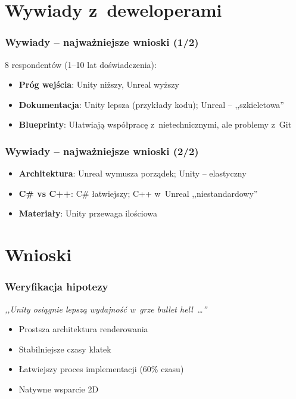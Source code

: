 \documentclass{beamer}
\begin{document}
\section{Wywiady z~deweloperami}

\begin{frame}
  \frametitle{Wywiady -- najważniejsze wnioski (1/2)}
  8 respondentów (1--10 lat doświadczenia):
  \vspace{0.2cm}
  \begin{itemize}
    \item \textbf{Próg wejścia}: Unity niższy, Unreal wyższy
    \item \textbf{Dokumentacja}: Unity lepsza (przykłady kodu); Unreal -- ,,szkieletowa''
    \item \textbf{Blueprinty}: Ułatwiają współpracę z~nietechnicznymi, ale problemy z~Git
  \end{itemize}
\end{frame}

\begin{frame}
  \frametitle{Wywiady -- najważniejsze wnioski (2/2)}
  \begin{itemize}
    \item \textbf{Architektura}: Unreal wymusza porządek; Unity -- elastyczny
    \item \textbf{C\# vs C++}: C\# łatwiejszy; C++ w~Unreal ,,niestandardowy''
    \item \textbf{Materiały}: Unity przewaga ilościowa
  \end{itemize}
\end{frame}

\section{Wnioski}

\begin{frame}
  \frametitle{Weryfikacja hipotezy}
  \textit{,,Unity osiągnie lepszą wydajność w~grze bullet hell~\ldots''}
  \vspace{0.5cm}

  \begin{itemize}
    \item Prostsza architektura renderowania
    \item Stabilniejsze czasy klatek
    \item Łatwiejszy proces implementacji (60\% czasu)
    \item Natywne wsparcie 2D
  \end{itemize}
\end{frame}
\end{document}
